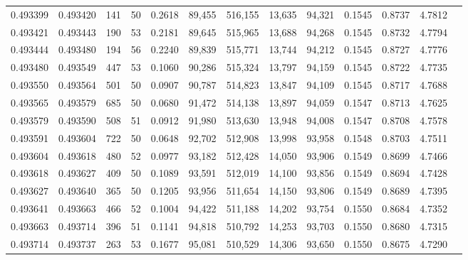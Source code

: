 \begin{tabular}{rrrrrrrrrrrrr}
0.493399 & 0.493420 & 141 &  50 &                                     0.2618 &  89,455 & 516,155 &  13,635 &  94,321 & 0.1545 & 0.8737 & 4.7812 \\
0.493421 & 0.493443 & 190 &  53 &                                     0.2181 &  89,645 & 515,965 &  13,688 &  94,268 & 0.1545 & 0.8732 & 4.7794 \\
0.493444 & 0.493480 & 194 &  56 &                                     0.2240 &  89,839 & 515,771 &  13,744 &  94,212 & 0.1545 & 0.8727 & 4.7776 \\
0.493480 & 0.493549 & 447 &  53 &                                     0.1060 &  90,286 & 515,324 &  13,797 &  94,159 & 0.1545 & 0.8722 & 4.7735 \\
0.493550 & 0.493564 & 501 &  50 &                                     0.0907 &  90,787 & 514,823 &  13,847 &  94,109 & 0.1545 & 0.8717 & 4.7688 \\
0.493565 & 0.493579 & 685 &  50 &                                     0.0680 &  91,472 & 514,138 &  13,897 &  94,059 & 0.1547 & 0.8713 & 4.7625 \\
0.493579 & 0.493590 & 508 &  51 &                                     0.0912 &  91,980 & 513,630 &  13,948 &  94,008 & 0.1547 & 0.8708 & 4.7578 \\
0.493591 & 0.493604 & 722 &  50 &                                     0.0648 &  92,702 & 512,908 &  13,998 &  93,958 & 0.1548 & 0.8703 & 4.7511 \\
0.493604 & 0.493618 & 480 &  52 &                                     0.0977 &  93,182 & 512,428 &  14,050 &  93,906 & 0.1549 & 0.8699 & 4.7466 \\
0.493618 & 0.493627 & 409 &  50 &                                     0.1089 &  93,591 & 512,019 &  14,100 &  93,856 & 0.1549 & 0.8694 & 4.7428 \\
0.493627 & 0.493640 & 365 &  50 &                                     0.1205 &  93,956 & 511,654 &  14,150 &  93,806 & 0.1549 & 0.8689 & 4.7395 \\
0.493641 & 0.493663 & 466 &  52 &                                     0.1004 &  94,422 & 511,188 &  14,202 &  93,754 & 0.1550 & 0.8684 & 4.7352 \\
0.493663 & 0.493714 & 396 &  51 &                                     0.1141 &  94,818 & 510,792 &  14,253 &  93,703 & 0.1550 & 0.8680 & 4.7315 \\
0.493714 & 0.493737 & 263 &  53 &                                     0.1677 &  95,081 & 510,529 &  14,306 &  93,650 & 0.1550 & 0.8675 & 4.7290 \\

\end{tabular}
